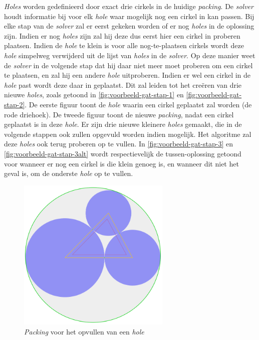 \documentclass[12pt,a4paper,oneside]{book}
\begin{document}
{\textit{Holes} worden gedefinieerd door exact drie cirkels in de huidige \textit{packing}.
De \textit{solver} houdt informatie bij voor elk \textit{hole} waar mogelijk nog een cirkel in kan passen.
Bij elke stap van de \textit{solver} zal er eerst gekeken worden of er nog \textit{holes} in de oplossing zijn.
Indien er nog \textit{holes} zijn zal hij deze dus eerst hier een cirkel in proberen plaatsen.
Indien de \textit{hole} te klein is voor alle nog-te-plaatsen cirkels wordt deze \textit{hole} simpelweg verwijderd uit de lijst van \textit{holes} in de \textit{solver}.
Op deze manier weet de \textit{solver} in de volgende stap dat hij daar niet meer moet proberen om een cirkel te plaatsen, en zal hij een andere \textit{hole} uitproberen.
Indien er wel een cirkel in de \textit{hole} past wordt deze daar in geplaatst.
Dit zal leiden tot het creëren van drie nieuwe \textit{holes}, zoals getoond in \autoref{fig:voorbeeld-gat-stap-1} en \autoref{fig:voorbeeld-gat-stap-2}.
De eerste figuur toont de \textit{hole} waarin een cirkel geplaatst zal worden (de rode driehoek).
De tweede figuur toont de nieuwe \textit{packing}, nadat een cirkel geplaatst is in deze \textit{hole}.
Er zijn drie nieuwe kleinere \textit{holes} gemaakt, die in de volgende stappen ook zullen opgevuld worden indien mogelijk.
Het algoritme zal deze \textit{holes} ook terug proberen op te vullen.
In \autoref{fig:voorbeeld-gat-stap-3} en \autoref{fig:voorbeeld-gat-stap-3alt} wordt respectievelijk de tussen-oplossing getoond voor wanneer er nog een cirkel is die klein genoeg is, en wanneer dit niet het geval is, om de onderste \textit{hole} op te vullen.

\begin{figure}
  \centering
  \includegraphics[width=0.65\textwidth]{voorbeeld-gat-stap-1.png}
  \caption{\textit{Packing} voor het opvullen van een \textit{hole}} \label{fig:voorbeeld-gat-stap-1} 
\end{figure}

}
\end{document}
